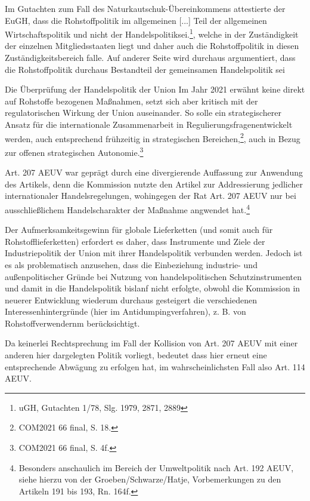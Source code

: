 \documentclass[12pt,a4paper,oneside]{book} %
\begin{document}
Im Gutachten zum Fall des Naturkautschuk-Übereinkommens attestierte der EuGH, dass die \glqq Rohstoffpolitik im allgemeinen [...] Teil der allgemeinen Wirtschaftspolitik und nicht der Handelspolitik\grqq sei.\footnote{ uGH, Gutachten 1/78, Slg. 1979, 2871, 2889}, welche in der Zuständigkeit der einzelnen Mitgliedsstaaten liegt und daher auch die Rohstoffpolitik in diesen Zuständigkeitsbereich falle. Auf anderer Seite wird durchaus argumentiert, dass die Rohstoffpolitik durchaus Bestandteil der gemeinsamen Handelspolitik sei\autocite{Benedek, Art. 179 EGV, Rn. 6, 2009, 40. Aufl.}

Die Überprüfung der Handelspolitik der Union Im Jahr 2021 erwähnt keine direkt auf Rohstoffe bezogenen Maßnahmen, setzt sich aber kritisch mit der regulatorischen Wirkung der Union auseinander. So solle ein \glqq strategischerer Ansatz für die internationale Zusammenarbeit in Regulierungsfragen\grqq entwickelt werden, auch entsprechend frühzeitig in strategischen Bereichen,\footnote{COM2021 66 final, S. 18.}, auch in Bezug zur offenen strategischen Autonomie.\footnote{COM2021 66 final, S. 4f.}
	
Art. 207 AEUV war geprägt durch eine divergierende Auffassung zur Anwendung des Artikels, denn die Kommission nutzte den Artikel zur Addressierung jedlicher internationaler Handelsregelungen, wohingegen der Rat Art. 207 AEUV nur bei ausschließlichem Handelscharakter der Maßnahme angwendet hat.\footnote{Besonders anschaulich im Bereich der Umweltpolitik nach Art. 192 AEUV, siehe hierzu von der Groeben/Schwarze/Hatje, Vorbemerkungen zu den Artikeln 191 bis 193, Rn. 164f.} 

Der Aufmerksamkeitsgewinn für globale Lieferketten (und somit auch für Rohstofflieferketten) erfordert es daher, dass Instrumente und Ziele der Industriepolitik der Union mit ihrer Handelspolitik verbunden werden.\autocite{	Calliess/Ruffert, EUV/AEUV, AEUV Art. 207, Rn. 132} Jedoch ist es als problematisch anzusehen, dass die Einbeziehung industrie- und außenpolitischer Gründe bei Nutzung von handelspolitischen Schutzinstrumenten und damit in die Handelspolitik bislanf nicht erfolgte, obwohl die Kommission in neuerer Entwicklung wiederum durchaus gesteigert die verschiedenen Interessenhintergründe (hier im Antidumpingverfahren), z. B. von Rohstoffverwendernm berücksichtigt.\autocite{Weiß	Das Recht der Europäischen Union, AEUV Art. 207, Rn. 164}

	
Da keinerlei Rechtsprechung im Fall der Kollision von Art. 207 AEUV mit einer anderen hier dargelegten Politik vorliegt, bedeutet dass hier erneut eine entsprechende Abwägung zu erfolgen hat, im wahrscheinlichsten Fall also Art. 114 AEUV.
	
\end{document}
